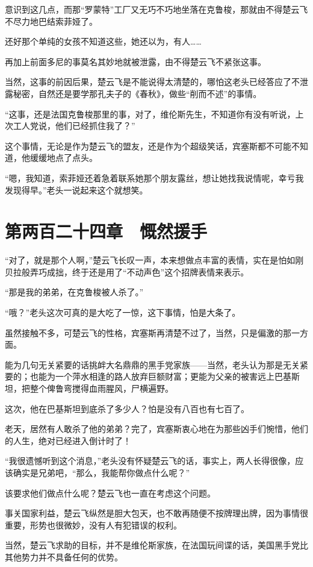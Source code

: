 意识到这几点，而那“罗蒙特”工厂又无巧不巧地坐落在克鲁梭，那就由不得楚云飞不尽力地巴结索菲娅了。

还好那个单纯的女孩不知道这些，她还以为，有人……

再加上前面多尼的事莫名其妙地就被泄露，由不得楚云飞不紧张这事。

当然，这事的前因后果，楚云飞是不能说得太清楚的，哪怕这老头已经答应了不泄露秘密，自然还是要学那孔夫子的《春秋》，做些“削而不述”的事情。

“这事，还是法国克鲁梭那里的事，对了，维伦斯先生，不知道你有没有听说，上次工人党说，他们已经抓住我了？”

这个事情，无论是作为楚云飞的盟友，还是作为个超级笑话，宾塞斯都不可能不知道，他缓缓地点了点头。

“嗯，我知道，索菲娅还着急着联系她那个朋友露丝，想让她找我说情呢，幸亏我发现得早。”老头一说起来这个就想笑。

\section{第两百二十四章　慨然援手}

“对了，就是那个人啊，”楚云飞长叹一声，本来想做点丰富的表情，实在是怕如刚贝拉般弄巧成拙，终于还是用了“不动声色”这个招牌表情来表示。

“那是我的弟弟，在克鲁梭被人杀了。”

“哦？”老头这次可真的是大吃了一惊，这下事情，怕是大条了。

虽然接触不多，可楚云飞的性格，宾塞斯再清楚不过了，当然，只是偏激的那一方面。

能为几句无关紧要的话挑衅大名鼎鼎的黑手党家族——当然，老头认为那是无关紧要的；也能为一个萍水相逢的路人放弃巨额财富；更能为父亲的被害远上巴基斯坦，把整个俾鲁弯搅得血雨腥风，尸横遍野。

这次，他在巴基斯坦到底杀了多少人？怕是没有八百也有七百了。

老天，居然有人敢杀了他的弟弟？完了，宾塞斯衷心地在为那些凶手们惋惜，他们的人生，绝对已经进入倒计时了！

“我很遗憾听到这个消息，”老头没有怀疑楚云飞的话，事实上，两人长得很像，应该确实是兄弟吧，“那么，我能帮你做点什么呢？”

该要求他们做点什么呢？楚云飞也一直在考虑这个问题。

事关国家利益，楚云飞纵然是胆大包天，也不敢再随便不按牌理出牌，因为事情很重要，形势也很微妙，没有人有犯错误的权利。

当然，楚云飞求助的目标，并不是维伦斯家族，在法国玩间谍的话，美国黑手党比其他势力并不具备任何的优势。

